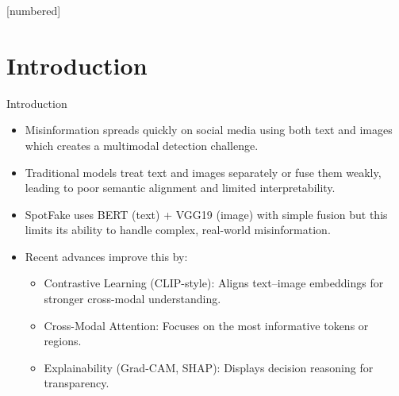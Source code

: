 \documentclass[xcolor=dvipsnames,aspectratio=169]{beamer}
\begin{document}
[numbered]




\section{Introduction}
\begin{frame}{Introduction}

	\begin{itemize}
		\item Misinformation spreads quickly on social media using both text and images which creates a multimodal detection challenge. \\
        
        \item Traditional models treat text and images separately or fuse them weakly, leading to poor semantic alignment and limited interpretability.\\
        
        \item SpotFake uses BERT (text) + VGG19 (image) with simple fusion but this limits its ability to handle complex, real-world misinformation. \\
        
        \item Recent advances improve this by:
        \begin{itemize}
            \item Contrastive Learning (CLIP-style): Aligns text–image embeddings for stronger cross-modal understanding.
            \item Cross-Modal Attention: Focuses on the most informative tokens or regions.
            \item Explainability (Grad-CAM, SHAP): Displays decision reasoning for transparency.
        \end{itemize}
	\end{itemize}
\end{frame}


\end{document}
